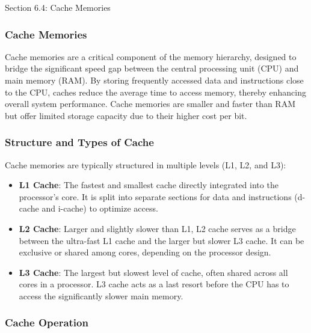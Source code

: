 \begin{notes}{Section 6.4: Cache Memories}
    \subsubsection*{Cache Memories}

    Cache memories are a critical component of the memory hierarchy, designed to bridge the significant speed gap between the central processing unit (CPU) and main memory (RAM). By storing frequently 
    accessed data and instructions close to the CPU, caches reduce the average time to access memory, thereby enhancing overall system performance. Cache memories are smaller and faster than RAM but 
    offer limited storage capacity due to their higher cost per bit. \vspace*{1em}
    
    \subsubsection*{Structure and Types of Cache}
    
    Cache memories are typically structured in multiple levels (L1, L2, and L3):
    
    \begin{itemize}
        \item \textbf{L1 Cache}: The fastest and smallest cache directly integrated into the processor's core. It is split into separate sections for data and instructions (d-cache and i-cache) to 
        optimize access.
        \item \textbf{L2 Cache}: Larger and slightly slower than L1, L2 cache serves as a bridge between the ultra-fast L1 cache and the larger but slower L3 cache. It can be exclusive or shared among 
        cores, depending on the processor design.
        \item \textbf{L3 Cache}: The largest but slowest level of cache, often shared across all cores in a processor. L3 cache acts as a last resort before the CPU has to access the significantly 
        slower main memory.
    \end{itemize}
    
    \vspace*{1em}
    
    \subsubsection*{Cache Operation}
    

\end{notes}
